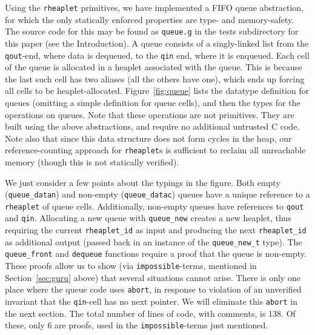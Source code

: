 \documentclass[9pt,natbib]{sigplanconf}
\begin{document}
Using the \texttt{rheaplet} primitives, we have implemented a FIFO
queue abstraction, for which the only statically enforced properties
are type- and memory-safety.  The source code for this may be found as
\texttt{queue.g} in the tests subdirectory for this paper (see the
Introduction).  A queue consists of a singly-linked list from the
\texttt{qout}-end, where data is dequeued, to the \texttt{qin} end,
where it is enqueued.  Each cell of the queue is allocated in a
heaplet associated with the queue.  This is because the last such cell
has two aliases (all the others have one), which ends up forcing all
cells to be heaplet-allocated.  Figure~\ref{fig:queue} lists the
datatype definition for queues (omitting a simple definition for queue
cells), and then the types for the operations on queues.  Note that
these operations are not primitives.  They are built using the above
abstractions, and require no additional untrusted C code.  Note also
that since this data structure does not form cycles in the heap, our
reference-counting approach for \texttt{rheaplet}s is sufficient to
reclaim all unreachable memory (though this is not statically
verified).

We just consider a few points about the typings in the figure.  Both
empty (\texttt{queue\_datan}) and non-empty (\texttt{queue\_datac})
queues have a unique reference to a \texttt{rheaplet} of queue cells.
Additionally, non-empty queues have references to \texttt{qout} and
\texttt{qin}.  Allocating a new queue with \texttt{queue\_new} creates
a new heaplet, thus requiring the current \texttt{rheaplet\_id} as
input and producing the next \texttt{rheaplet\_id} as additional
output (passed back in an instance of the \texttt{queue\_new\_t}
type).  The \texttt{queue\_front} and \texttt{dequeue} functions
require a proof that the queue is non-empty.  These proofs allow us to
show (via \texttt{impossible}-terms, mentioned in
Section~\ref{sec:guru} above) that several situations cannot arise.
There is only one place where the queue code uses \texttt{abort}, in
response to violation of an unverified invariant that the
\texttt{qin}-cell has no next pointer.  We will eliminate this
\texttt{abort} in the next section.  The total number of lines of
code, with comments, is 138.  Of these, only 6 are proofs, used in the
\texttt{impossible}-terms just mentioned.
\end{document}

